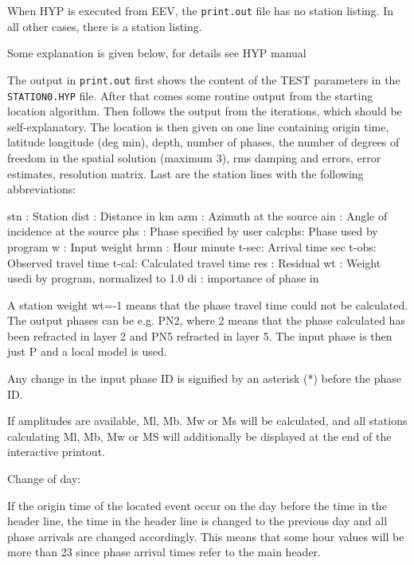 When HYP is executed from EEV, the \texttt{print.out} file has no station listing. In all other cases, there is a station listing. 

Some explanation is given below, for details see HYP manual 

The output in \texttt{print.out} first shows the content of the TEST parameters in the \texttt{STATION0.HYP} file. After that comes some routine output from the starting location algorithm. Then follows the output from the iterations, which should be self-explanatory. The location is then given on one line containing origin time, latitude longitude (deg min), depth, number of phases, the number of degrees of freedom in the spatial solution (maximum 3), rms damping and errors, error estimates, resolution matrix. Last are the station lines with the following abbreviations: 

\begin{boxedverbatim}
stn  : Station 
dist : Distance in km 
azm  : Azimuth at the source  
ain  : Angle of incidence at the source 
phs  : Phase specified by user
calcphs: Phase used by program
w    : Input weight 
hrmn : Hour minute 
t-sec: Arrival time sec 
t-obs: Observed travel time 
t-cal: Calculated travel time 
res  : Residual 
wt   : Weight usedi by program, normalized to 1.0
di   : importance of phase in %
\end{boxedverbatim}

A station weight wt=-1 means that the phase travel time could not be calculated. 
The output phases can be e.g. PN2, where 2 means that the phase calculated has been refracted in layer 2 and PN5 refracted in layer 5. The input phase is then just P and a local model is used.

Any change in the input phase ID is signified by an asterisk (*) before the phase ID. 

If amplitudes are available, Ml, Mb. Mw or Ms will be calculated, and all stations calculating Ml, Mb, Mw or MS will additionally be displayed at the end of the interactive printout. 

Change of day: 

If the origin time of the located event occur on the day before the time in the header line, the time in the header line is changed to the previous day and all phase arrivals are changed accordingly. This means that some hour values will be more than 23 since phase arrival times refer to the main header. 

